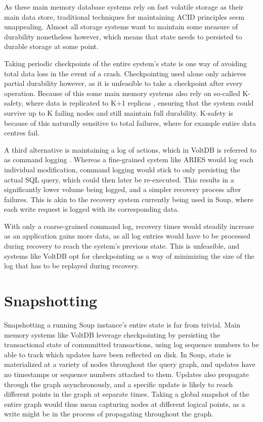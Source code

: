 \documentclass[b5paper]{report}
\begin{document}
As these main memory database systems rely on fast volatile storage as their
main data store, traditional techniques for maintaining ACID principles seem
unappealing. Almost all storage systems want to maintain some measure of
durability nonetheless however, which means that state needs to persisted to
durable storage at some point.

Taking periodic checkpoints of the entire system's state is one way of avoiding
total data loss in the event of a crash. Checkpointing used alone only achieves
partial durability however, as it is unfeasible to take a checkpoint after every
operation. Because of this some main memory systems also rely on so-called
K-safety, where data is replicated to K+1 replicas \cite{memory-checkpoint},
ensuring that the system could survive up to K failing nodes and still maintain
full durability. K-safety is because of this naturally sensitive to total
failures, where for example entire data centres fail.

A third alternative is maintaining a log of actions, which in VoltDB is referred
to as command logging \cite{voltdb-recovery}. Whereas a fine-grained system like
ARIES would log each individual modification, command logging would stick to
only persisting the actual SQL query, which could then later be re-executed.
This results in a significantly lower volume being logged, and a simpler
recovery process after failures. This is akin to the recovery system currently
being used in Soup, where each write request is logged with its corresponding
data.

With only a coarse-grained command log, recovery times would steadily increase
as an application gains more data, as all log entries would have to be processed
during recovery to reach the system's previous state. This is unfeasible, and
systems like VoltDB opt for checkpointing as a way of minimizing the size of the
log that has to be replayed during recovery.

\section{Snapshotting}
Snapshotting a running Soup instance's entire state is far from trivial.
Main memory systems like VoltDB leverage checkpointing by persisting the
transactional state of commmitted transactions, using log sequence numbers to be
able to track which updates have been reflected on disk. In Soup, state is
materialized at a variety of nodes throughout the query graph, and updates have no
timestamps or sequence numbers attached to them. Updates also propagate through
the graph asynchronously, and a specific update is likely to reach different
points in the graph at separate times. Taking a global snapshot of the entire
graph would thus mean capturing nodes at different logical points, as a write
might be in the process of propagating throughout the graph.
\end{document}
